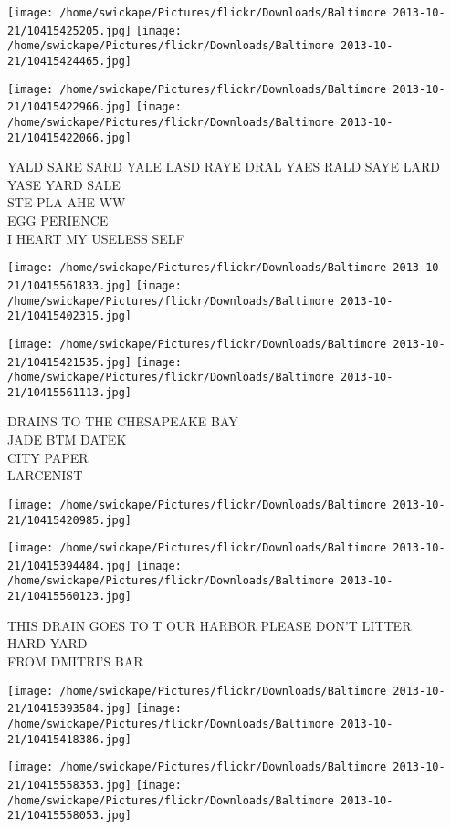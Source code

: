 \documentclass[10pt,letterpaper]{article}
\begin{document}
\texttt{[image: /home/swickape/Pictures/flickr/Downloads/Baltimore 2013-10-21/10415425205.jpg]}
\texttt{[image: /home/swickape/Pictures/flickr/Downloads/Baltimore 2013-10-21/10415424465.jpg]}

\texttt{[image: /home/swickape/Pictures/flickr/Downloads/Baltimore 2013-10-21/10415422966.jpg]}
\texttt{[image: /home/swickape/Pictures/flickr/Downloads/Baltimore 2013-10-21/10415422066.jpg]}

YALD SARE SARD YALE LASD RAYE DRAL YAES RALD SAYE LARD YASE YARD SALE\\
STE PLA AHE WW\\
EGG PERIENCE\\
I HEART MY USELESS SELF
\pagebreak

\texttt{[image: /home/swickape/Pictures/flickr/Downloads/Baltimore 2013-10-21/10415561833.jpg]}
\texttt{[image: /home/swickape/Pictures/flickr/Downloads/Baltimore 2013-10-21/10415402315.jpg]}

\texttt{[image: /home/swickape/Pictures/flickr/Downloads/Baltimore 2013-10-21/10415421535.jpg]}
\texttt{[image: /home/swickape/Pictures/flickr/Downloads/Baltimore 2013-10-21/10415561113.jpg]}

DRAINS TO THE CHESAPEAKE BAY\\
JADE BTM DATEK\\
CITY PAPER\\
LARCENIST
\pagebreak

\texttt{[image: /home/swickape/Pictures/flickr/Downloads/Baltimore 2013-10-21/10415420985.jpg]}

\vspace{0.25in}
\texttt{[image: /home/swickape/Pictures/flickr/Downloads/Baltimore 2013-10-21/10415394484.jpg]}
\texttt{[image: /home/swickape/Pictures/flickr/Downloads/Baltimore 2013-10-21/10415560123.jpg]}

THIS DRAIN GOES TO T OUR HARBOR PLEASE DON'T LITTER\\
HARD YARD\\
FROM DMITRI'S BAR
\pagebreak

\texttt{[image: /home/swickape/Pictures/flickr/Downloads/Baltimore 2013-10-21/10415393584.jpg]}
\texttt{[image: /home/swickape/Pictures/flickr/Downloads/Baltimore 2013-10-21/10415418386.jpg]}

\texttt{[image: /home/swickape/Pictures/flickr/Downloads/Baltimore 2013-10-21/10415558353.jpg]}
\texttt{[image: /home/swickape/Pictures/flickr/Downloads/Baltimore 2013-10-21/10415558053.jpg]}
\end{document}
